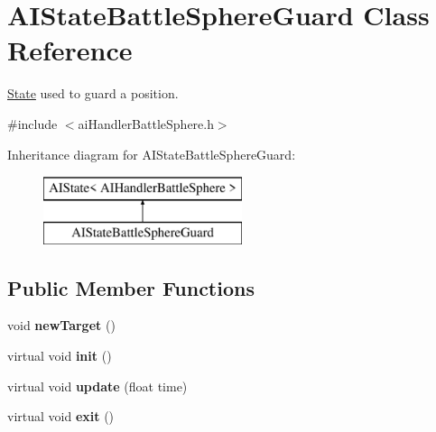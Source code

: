 \hypertarget{classAIStateBattleSphereGuard}{
\section{\-A\-I\-State\-Battle\-Sphere\-Guard \-Class \-Reference}
\label{d0/d5c/classAIStateBattleSphereGuard}
}


\hyperlink{classState}{\-State} used to guard a position.  




{\ttfamily \#include $<$ai\-Handler\-Battle\-Sphere.\-h$>$}

\-Inheritance diagram for \-A\-I\-State\-Battle\-Sphere\-Guard\-:\begin{figure}[H]
\begin{center}
\leavevmode
\includegraphics[height=2.000000cm]{d0/d5c/classAIStateBattleSphereGuard}
\end{center}
\end{figure}
\subsection*{\-Public \-Member \-Functions}
\begin{DoxyCompactItemize}
\item 
\hypertarget{classAIStateBattleSphereGuard_a91a39f17ab7f7469192cf65b721c843e}{
void {\bfseries new\-Target} ()}
\label{d0/d5c/classAIStateBattleSphereGuard_a91a39f17ab7f7469192cf65b721c843e}

\item 
\hypertarget{classAIStateBattleSphereGuard_a3276120420f02931725973498d274e88}{
virtual void {\bfseries init} ()}
\label{d0/d5c/classAIStateBattleSphereGuard_a3276120420f02931725973498d274e88}

\item 
\hypertarget{classAIStateBattleSphereGuard_a161cd278d397e1fbf384dbcd0c736038}{
virtual void {\bfseries update} (float time)}
\label{d0/d5c/classAIStateBattleSphereGuard_a161cd278d397e1fbf384dbcd0c736038}

\item 
\hypertarget{classAIStateBattleSphereGuard_a9460ebcab0eeefab1e41f3793f7d5426}{
virtual void {\bfseries exit} ()}
\label{d0/d5c/classAIStateBattleSphereGuard_a9460ebcab0eeefab1e41f3793f7d5426}

\end{DoxyCompactItemize}
